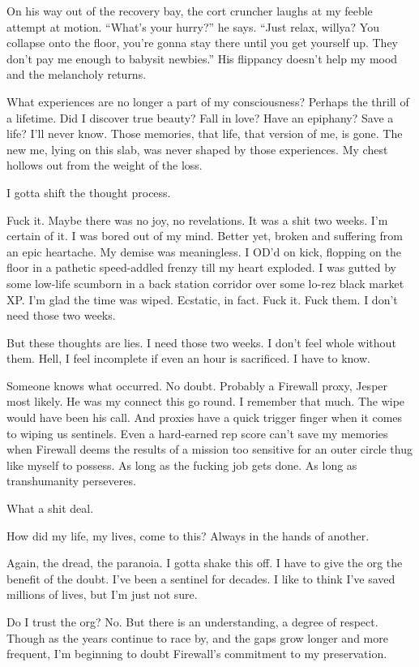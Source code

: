 On his way out of the recovery bay, the cort cruncher laughs at my feeble attempt at motion. ``What's your hurry?'' he says. ``Just relax, willya? You collapse onto the floor, you're gonna stay there until you get yourself up. They don't pay me enough to babysit newbies.'' His flippancy doesn't help my mood and the melancholy returns. 

What experiences are no longer a part of my consciousness? Perhaps the thrill of a lifetime. Did I discover true beauty? Fall in love? Have an epiphany? Save a life? I'll never know. Those memories, that life, that version of me, is gone. The new me, lying on this slab, was never shaped by those experiences. My chest hollows out from the weight of the loss. 

I gotta shift the thought process. 

Fuck it. Maybe there was no joy, no revelations. It was a shit two weeks. I'm certain of it. I was bored out of my mind. Better yet, broken and suffering from an epic heartache. My demise was meaningless. I OD'd on kick, flopping on the floor in a pathetic speed-addled frenzy till my heart exploded. I was gutted by some low-life scumborn in a back station corridor over some lo-rez black market XP. I'm glad the time was wiped. Ecstatic, in fact. Fuck it. Fuck them. I don't need those two weeks. 

But these thoughts are lies. I need those two weeks. I don't feel whole without them. Hell, I feel incomplete if even an hour is sacrificed. I have to know. 

Someone knows what occurred. No doubt. Probably a Firewall proxy, Jesper most likely. He was my connect this go round. I remember that much. The wipe would have been his call. And proxies have a quick trigger finger when it comes to wiping us sentinels. Even a hard-earned rep score can't save my memories when Firewall deems the results of a mission too sensitive for an outer circle thug like myself to possess. As long as the fucking job gets done. As long as transhumanity perseveres. 

What a shit deal. 

How did my life, my lives, come to this? Always in the hands of another. 

Again, the dread, the paranoia. I gotta shake this off. I have to give the org the benefit of the doubt. I've been a sentinel for decades. I like to think I've saved millions of lives, but I'm just not sure. 

Do I trust the org? No. But there is an understanding, a degree of respect. Though as the years continue to race by, and the gaps grow longer and more frequent, I'm beginning to doubt Firewall's commitment to my preservation. 


